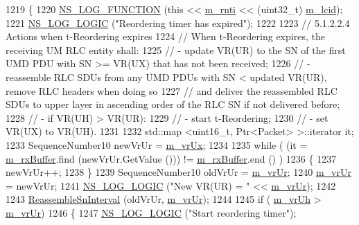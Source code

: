 \begin{DoxyCode}
1219 \{
1220   \hyperlink{log-macros-disabled_8h_a90b90d5bad1f39cb1b64923ea94c0761}{NS\_LOG\_FUNCTION} (\textcolor{keyword}{this} << \hyperlink{classns3_1_1LteRlc_a48ab0a78e7f2687337075b1c8832df70}{m\_rnti} << (uint32\_t) \hyperlink{classns3_1_1LteRlc_a051085e9b27883e7ba4b98ad7242fd8a}{m\_lcid});
1221   \hyperlink{group__logging_ga88acd260151caf2db9c0fc84997f45ce}{NS\_LOG\_LOGIC} (\textcolor{stringliteral}{"Reordering timer has expired"});
1222 
1223   \textcolor{comment}{// 5.1.2.2.4 Actions when t-Reordering expires}
1224   \textcolor{comment}{// When t-Reordering expires, the receiving UM RLC entity shall:}
1225   \textcolor{comment}{// - update VR(UR) to the SN of the first UMD PDU with SN >= VR(UX) that has not been received;}
1226   \textcolor{comment}{// - reassemble RLC SDUs from any UMD PDUs with SN < updated VR(UR), remove RLC headers when doing so}
1227   \textcolor{comment}{//   and deliver the reassembled RLC SDUs to upper layer in ascending order of the RLC SN if not
       delivered before;}
1228   \textcolor{comment}{// - if VR(UH) > VR(UR):}
1229   \textcolor{comment}{//    - start t-Reordering;}
1230   \textcolor{comment}{//    - set VR(UX) to VR(UH).}
1231 
1232   std::map <uint16\_t, Ptr<Packet> >::iterator it;
1233   SequenceNumber10 newVrUr = \hyperlink{classns3_1_1LteRlcUm_a84c0cd7290e00e953d7990e7130f2779}{m\_vrUx};
1234 
1235   \textcolor{keywordflow}{while} ( (it = \hyperlink{classns3_1_1LteRlcUm_aa4611282929afb798d591eafca1e6adb}{m\_rxBuffer}.find (newVrUr.GetValue ())) != \hyperlink{classns3_1_1LteRlcUm_aa4611282929afb798d591eafca1e6adb}{m\_rxBuffer}.end () )
1236     \{
1237       newVrUr++;
1238     \}
1239   SequenceNumber10 oldVrUr = \hyperlink{classns3_1_1LteRlcUm_a04515ea87c413d29a9be9b0a085f5d64}{m\_vrUr};
1240   \hyperlink{classns3_1_1LteRlcUm_a04515ea87c413d29a9be9b0a085f5d64}{m\_vrUr} = newVrUr;
1241   \hyperlink{group__logging_ga88acd260151caf2db9c0fc84997f45ce}{NS\_LOG\_LOGIC} (\textcolor{stringliteral}{"New VR(UR) = "} << \hyperlink{classns3_1_1LteRlcUm_a04515ea87c413d29a9be9b0a085f5d64}{m\_vrUr});
1242 
1243   \hyperlink{classns3_1_1LteRlcUm_a6c396626a8b5e65d70783e603486c832}{ReassembleSnInterval} (oldVrUr, \hyperlink{classns3_1_1LteRlcUm_a04515ea87c413d29a9be9b0a085f5d64}{m\_vrUr});
1244 
1245   \textcolor{keywordflow}{if} ( \hyperlink{classns3_1_1LteRlcUm_aac5ed94d69ff8dbcd7bda1cbe0d3f2f4}{m\_vrUh} > \hyperlink{classns3_1_1LteRlcUm_a04515ea87c413d29a9be9b0a085f5d64}{m\_vrUr})
1246     \{
1247       \hyperlink{group__logging_ga88acd260151caf2db9c0fc84997f45ce}{NS\_LOG\_LOGIC} (\textcolor{stringliteral}{"Start reordering timer"});

\end{DoxyCode}
